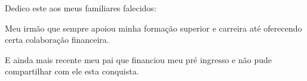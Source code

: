 
\begin{dedicatoria}
   \vspace*{\fill}
   \hspace{.45\textwidth}
   \begin{minipage}{.5\textwidth}
      \SingleSpacing
Dedico este aos meus familiares falecidos:

Meu irmão que sempre apoiou minha formação
superior e carreira até oferecendo certa
colaboração financeira.

E ainda mais recente meu pai que financiou
meu pré ingresso e não pude compartilhar
com ele esta conquista.
   \end{minipage}
	\vspace*{\fill}
\end{dedicatoria}
